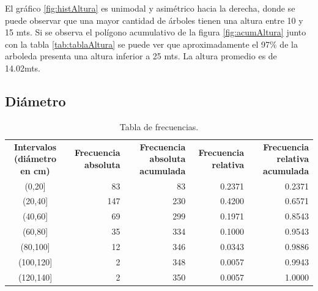 \documentclass[11pt]{article}
\begin{document}
\begin{justify}
  El gráfico \ref{fig:histAltura} es unimodal y asimétrico hacia la derecha,
  donde se puede observar
  que una mayor cantidad de árboles tienen una altura entre 10 y 15 mts.
  Si se observa el polígono acumulativo de la figura \ref{fig:acumAltura} 
  junto con la tabla \ref{tab:tablaAltura} se puede ver que aproximadamente
  el 97\% de la arboleda presenta una altura inferior a 25 mts.
  La altura promedio es de 14.02mts.
\end{justify}


\subsection{Diámetro}

\begin{table}[h!]
  \begin{center}
    \begin{tabular}{| c | r | r | r | r |}
      \hline
      \multirow{3}{3cm}{\centering\textbf{Intervalos (diámetro en cm)}} & 
      \multirow{3}{2.5cm}{\centering\textbf{Frecuencia absoluta}} & 
      \multirow{3}{2.5cm}{\centering\textbf{Frecuencia absoluta acumulada}} &
      \multirow{3}{2.5cm}{\centering\textbf{Frecuencia relativa}} & 
      \multirow{3}{2.5cm}{\centering\textbf{Frecuencia relativa acumulada}} \\
      & & & & \\
      & & & & \\ \hline
      (0,20] & 83 & 83 & 0.2371 & 0.2371 \\ \hline
      (20,40] & 147 & 230 & 0.4200 & 0.6571 \\ \hline
      (40,60] & 69 & 299 & 0.1971 & 0.8543 \\ \hline
      (60,80] & 35 & 334 & 0.1000 & 0.9543 \\ \hline
      (80,100] & 12 & 346 & 0.0343 & 0.9886 \\ \hline
      (100,120] & 2 & 348 & 0.0057 & 0.9943 \\ \hline
      (120,140] & 2 & 350 & 0.0057 & 1.0000 \\ \hline
    \end{tabular}
    \caption{Tabla de frecuencias.}
    \label{tab:tablaDiametro}
  \end{center}
\end{table}

\newpage
\end{document}
